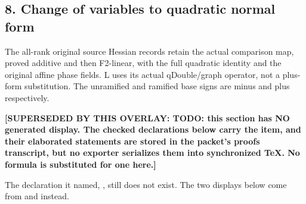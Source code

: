 \subsection*{8. Change of variables to quadratic normal form}
The all-rank original source Hessian records retain the actual comparison map, proved additive and then F2-linear, with the full quadratic identity and the original affine phase fields. L uses its actual qDouble/graph operator, not a plus-form substitution. The unramified and ramified base signs are minus and plus respectively.

\par\noindent\textbf{[SUPERSEDED BY THIS OVERLAY: TODO: this section has NO generated display. The checked declarations below carry the item, and their elaborated statements are stored in the packet's proofs transcript, but no exporter serializes them into synchronized TeX. No formula is substituted for one here.]}
\par\noindent The declaration it named, , still does not exist. The two displays below come from  and  instead.
